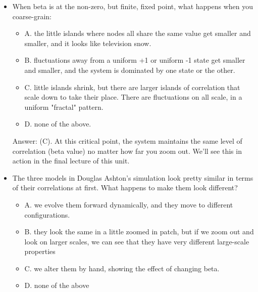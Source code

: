 \documentclass[]{article}
\begin{document}
\begin{itemize}
	\item When beta is at the non-zero, but finite, fixed point, what happens when you coarse-grain:
	
	\begin{itemize}
		\item 	A. the little islands where nodes all share the same value get smaller and smaller, and it looks like television snow.
		
		\item B. fluctuations away from a uniform +1 or uniform -1 state get smaller and smaller, and the system is dominated by one state or the other.
		
		\item C. little islands shrink, but there are larger islands of correlation that scale down to take their place. There are fluctuations on all scale, in a uniform "fractal" pattern.
		
		\item D. none of the above.
	\end{itemize}
	
	Answer: (C). At this critical point, the system maintains the same level of correlation (beta value) no matter how far you zoom out. We'll see this in action in the final lecture of this unit.
	

	
	\item The three models in Douglas Ashton's simulation look pretty similar in terms of their correlations at first. What happens to make them look different?
	
	\begin{itemize}
		\item 	A. we evolve them forward dynamically, and they move to different configurations.
		
		\item B. they look the same in a little zoomed in patch, but if we zoom out and look on larger scales, we can see that they have very different large-scale properties
		
		\item C.  we alter them by hand, showing the effect of changing beta.
		
		\item D.  none of the above
	\end{itemize}


\end{itemize}
\end{document}
